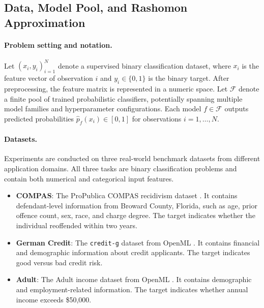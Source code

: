 \subsection{Data, Model Pool, and Rashomon Approximation}
\label{sec:framework-data-model-pool}

\paragraph{Problem setting and notation.}
Let \((x_i,y_i)_{i=1}^N\) denote a supervised binary classification dataset, where
\(x_i\) is the feature vector of observation \(i\) and \(y_i \in \{0,1\}\) is the binary
target. After preprocessing, the feature matrix is represented in a numeric space. Let $\mathcal{F}$ denote a finite pool of
trained probabilistic classifiers, potentially spanning multiple model families and
hyperparameter configurations. Each model $f \in \mathcal{F}$ outputs predicted
probabilities $\hat{p}_f(x_i) \in [0,1]$ for observations $i=1,\dots,N$.

\paragraph{Datasets.}
Experiments are conducted on three real-world benchmark datasets from different
application domains. All three tasks are binary classification problems and contain both
numerical and categorical input features.

\begin{itemize}
    \item \textbf{COMPAS}: The ProPublica COMPAS recidivism dataset
    \citep{angwin_machine_2016, larson_how_2016}. It contains defendant-level
    information from Broward County, Florida, such as age, prior offence count, sex,
    race, and charge degree. The target indicates whether the individual reoffended
    within two years.

    \item \textbf{German Credit}: The \texttt{credit-g} dataset from OpenML
    \citep{hofmann_statlog_1994}. It contains financial and demographic information
    about credit applicants. The target indicates good versus bad credit risk.

    \item \textbf{Adult}: The Adult income dataset from OpenML
    \citep{becker_adult_1996}. It contains demographic and employment-related
    information. The target indicates whether annual income exceeds \$50{,}000.
\end{itemize}


